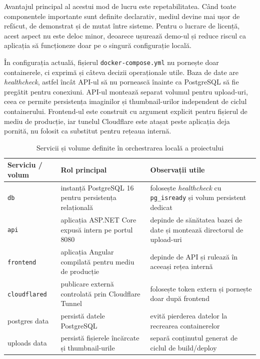Avantajul principal al acestui mod de lucru este repetabilitatea. Când toate componentele importante sunt definite declarativ, mediul devine mai ușor de refăcut, de demonstrat și de mutat între sisteme. Pentru o lucrare de licență, acest aspect nu este deloc minor, deoarece ușurează demo-ul și reduce riscul ca aplicația să funcționeze doar pe o singură configurație locală.

În configurația actuală, fișierul \texttt{docker-compose.yml} nu pornește doar containerele, ci exprimă și câteva decizii operaționale utile. Baza de date are \textit{healthcheck}, astfel încât API-ul să nu pornească înainte ca PostgreSQL să fie pregătit pentru conexiuni. API-ul montează separat volumul pentru upload-uri, ceea ce permite persistența imaginilor și thumbnail-urilor independent de ciclul containerului. Frontend-ul este construit cu argument explicit pentru fișierul de mediu de producție, iar tunelul Cloudflare este atașat peste aplicația deja pornită, nu folosit ca substitut pentru rețeaua internă.

\begin{table}[H]
  \centering
  \caption{Servicii și volume definite în orchestrarea locală a proiectului}
  \label{tab:docker-servicii}
  \renewcommand{\arraystretch}{1.15}
  \begin{tabularx}{\textwidth}{>{\RaggedRight\arraybackslash}p{2.8cm}YY}
    \toprule
    \textbf{Serviciu / volum} & \textbf{Rol principal} & \textbf{Observații utile} \\
    \midrule
    \texttt{db} & instanță PostgreSQL 16 pentru persistența relațională & folosește \textit{healthcheck} cu \texttt{pg\_isready} și volum persistent dedicat \\
    \texttt{api} & aplicația ASP.NET Core expusă intern pe portul 8080 & depinde de sănătatea bazei de date și montează directorul de upload-uri \\
    \texttt{frontend} & aplicația Angular compilată pentru mediu de producție & depinde de API și rulează în aceeași rețea internă \\
    \texttt{cloudflared} & publicare externă controlată prin Cloudflare Tunnel & folosește token extern și pornește doar după frontend \\
    postgres data & persistă datele PostgreSQL & evită pierderea datelor la recrearea containerelor \\
    uploads data & persistă fișierele încărcate și thumbnail-urile & separă conținutul generat de ciclul de build/deploy \\
    \bottomrule
  \end{tabularx}
\end{table}

